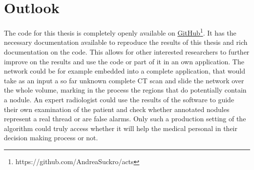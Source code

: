 \documentclass[main.tex]{subfiles}
\begin{document}
\section{Outlook}
The code for this thesis is completely openly available on \href{https://github.com/AndreaSuckro/acts}{GitHub}\footnote{https://github.com/AndreaSuckro/acts}. It has the necessary documentation available to reproduce the results of this thesis and rich documentation on the code. This allows for other interested researchers to further improve on the results and use the code or part of it in an own application. The network could be for example embedded into a complete application, that would take as an input a so far unknown complete CT scan and slide the network over the whole volume, marking in the process the regions that do potentially contain a nodule. An expert radiologist could use the results of the software to guide their own examination of the patient and check whether annotated nodules represent a real thread or are false alarms. Only such a production setting of the algorithm could truly access whether it will help the medical personal in their decision making process or not.


\end{document}
